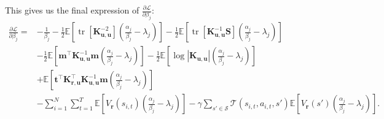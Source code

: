 \documentclass{article}
\theoremstyle{definition}
\DeclareMathOperator{\tr}{tr}
\newcommand{\Kuu}{\mathbf{K}_{\mathbf{u},\mathbf{u}}}
\newcommand{\Kru}{\mathbf{K}_{\mathbf{r},\mathbf{u}}}
\begin{document}
This gives us the final expression of $\frac{\partial\mathcal{L}}{\partial\beta_j}$:
\[
  \begin{split}
    \frac{\partial\mathcal{L}}{\partial\beta_j} = &- \frac{1}{\beta_j} -
    \frac{1}{2}\mathbb{E} \left[ \tr[\Kuu^{-2}] \left( \frac{\alpha_j}{\beta_j}
        - \lambda_j \right) \right] - \frac{1}{2}\mathbb{E} \left[
      \tr[\Kuu^{-1}\mathbf{S}] \left(\frac{\alpha_j}{\beta_j} - \lambda_j
      \right) \right] \\
    &- \frac{1}{2}\mathbb{E} \left[ \mathbf{m}^\intercal\Kuu^{-1}\mathbf{m}
      \left(\frac{\alpha_j}{\beta_j} - \lambda_j \right) \right] -
    \frac{1}{2}\mathbb{E} \left[ \log|\Kuu| \left(\frac{\alpha_j}{\beta_j} -
        \lambda_j \right) \right] \\
    &+ \mathbb{E} \left[ \mathbf{t}^\intercal\Kru^\intercal\Kuu^{-1}\mathbf{m}
      \left(\frac{\alpha_j}{\beta_j} - \lambda_j \right) \right] \\
    &- \sum_{i=1}^N \sum_{t=1}^T \mathbb{E} \left[ V_{\mathbf{r}}(s_{i,t})
      \left(\frac{\alpha_j}{\beta_j} - \lambda_j \right) \right] -
    \gamma\sum_{s' \in \mathcal{S}} \mathcal{T}(s_{i,t}, a_{i,t}, s')\mathbb{E}
    \left[V_{\mathbf{r}}(s') \left(\frac{\alpha_j}{\beta_j} - \lambda_j \right) \right].
  \end{split}
\]



\end{document}
